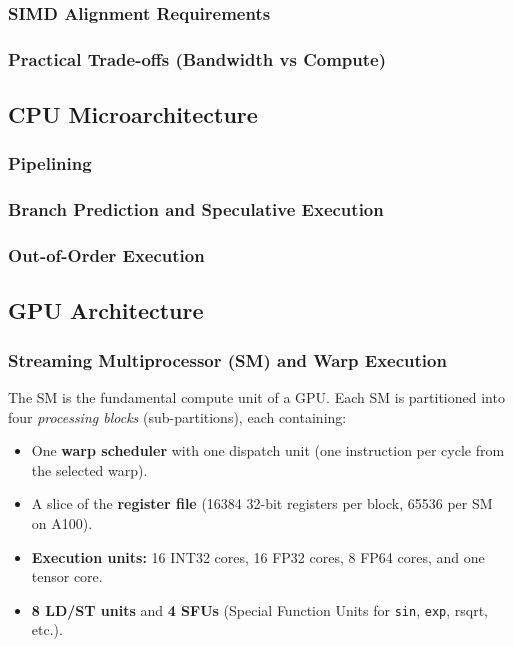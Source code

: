 \documentclass{article}
\begin{document}
\subsubsection{SIMD Alignment Requirements}
\subsubsection{Practical Trade-offs (Bandwidth vs Compute)}

\subsection{CPU Microarchitecture}
\subsubsection{Pipelining}
\subsubsection{Branch Prediction and Speculative Execution}
\subsubsection{Out-of-Order Execution}

\subsection{GPU Architecture}

\subsubsection{Streaming Multiprocessor (SM) and Warp Execution}
The SM is the fundamental compute unit of a GPU. Each SM is partitioned into four \emph{processing blocks} (sub-partitions), each containing:

\begin{itemize}
    \item One \textbf{warp scheduler} with one dispatch unit (one instruction per cycle from the selected warp).
    \item A slice of the \textbf{register file} (\num{16384} 32-bit registers per block, \num{65536} per SM on A100).
    \item \textbf{Execution units:} 16 INT32 cores, 16 FP32 cores, 8 FP64 cores, and one tensor core.
    \item \textbf{8 LD/ST units} and \textbf{4 SFUs} (Special Function Units for \texttt{sin}, \texttt{exp}, rsqrt, etc.).
\end{itemize}
\end{document}
